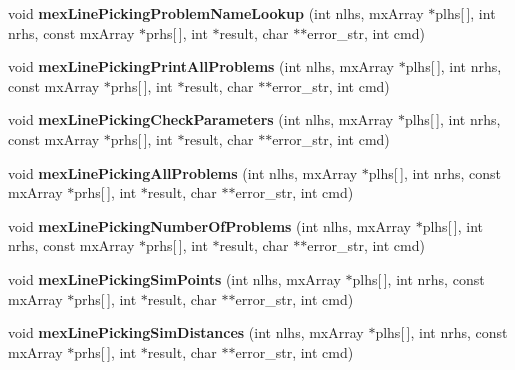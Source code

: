 \begin{DoxyCompactItemize}
\item 
\hypertarget{group__matlabapi_ga0b420739ee82f52e6eb0a9f194708103}{void {\bfseries mex\-Line\-Picking\-Problem\-Name\-Lookup} (int nlhs, mx\-Array $\ast$plhs\mbox{[}$\,$\mbox{]}, int nrhs, const mx\-Array $\ast$prhs\mbox{[}$\,$\mbox{]}, int $\ast$result, char $\ast$$\ast$error\-\_\-str, int cmd)}\label{group__matlabapi_ga0b420739ee82f52e6eb0a9f194708103}

\item 
\hypertarget{group__matlabapi_gac6aa898603e0bfeff24f7eb02492641f}{void {\bfseries mex\-Line\-Picking\-Print\-All\-Problems} (int nlhs, mx\-Array $\ast$plhs\mbox{[}$\,$\mbox{]}, int nrhs, const mx\-Array $\ast$prhs\mbox{[}$\,$\mbox{]}, int $\ast$result, char $\ast$$\ast$error\-\_\-str, int cmd)}\label{group__matlabapi_gac6aa898603e0bfeff24f7eb02492641f}

\item 
\hypertarget{group__matlabapi_ga517627c493a1789dc8eeebdbeecd8a8d}{void {\bfseries mex\-Line\-Picking\-Check\-Parameters} (int nlhs, mx\-Array $\ast$plhs\mbox{[}$\,$\mbox{]}, int nrhs, const mx\-Array $\ast$prhs\mbox{[}$\,$\mbox{]}, int $\ast$result, char $\ast$$\ast$error\-\_\-str, int cmd)}\label{group__matlabapi_ga517627c493a1789dc8eeebdbeecd8a8d}

\item 
\hypertarget{group__matlabapi_ga9566788e47662982902e53d2b80e9cf4}{void {\bfseries mex\-Line\-Picking\-All\-Problems} (int nlhs, mx\-Array $\ast$plhs\mbox{[}$\,$\mbox{]}, int nrhs, const mx\-Array $\ast$prhs\mbox{[}$\,$\mbox{]}, int $\ast$result, char $\ast$$\ast$error\-\_\-str, int cmd)}\label{group__matlabapi_ga9566788e47662982902e53d2b80e9cf4}

\item 
\hypertarget{group__matlabapi_ga3049623df917340a56fa5df6278d06f6}{void {\bfseries mex\-Line\-Picking\-Number\-Of\-Problems} (int nlhs, mx\-Array $\ast$plhs\mbox{[}$\,$\mbox{]}, int nrhs, const mx\-Array $\ast$prhs\mbox{[}$\,$\mbox{]}, int $\ast$result, char $\ast$$\ast$error\-\_\-str, int cmd)}\label{group__matlabapi_ga3049623df917340a56fa5df6278d06f6}

\item 
\hypertarget{group__matlabapi_ga339fe5ed825457a410e325d1aac7c1e5}{void {\bfseries mex\-Line\-Picking\-Sim\-Points} (int nlhs, mx\-Array $\ast$plhs\mbox{[}$\,$\mbox{]}, int nrhs, const mx\-Array $\ast$prhs\mbox{[}$\,$\mbox{]}, int $\ast$result, char $\ast$$\ast$error\-\_\-str, int cmd)}\label{group__matlabapi_ga339fe5ed825457a410e325d1aac7c1e5}

\item 
\hypertarget{group__matlabapi_ga055cc9a6e9a046038ebc1d4fbe13cb74}{void {\bfseries mex\-Line\-Picking\-Sim\-Distances} (int nlhs, mx\-Array $\ast$plhs\mbox{[}$\,$\mbox{]}, int nrhs, const mx\-Array $\ast$prhs\mbox{[}$\,$\mbox{]}, int $\ast$result, char $\ast$$\ast$error\-\_\-str, int cmd)}\label{group__matlabapi_ga055cc9a6e9a046038ebc1d4fbe13cb74}

\end{DoxyCompactItemize}


